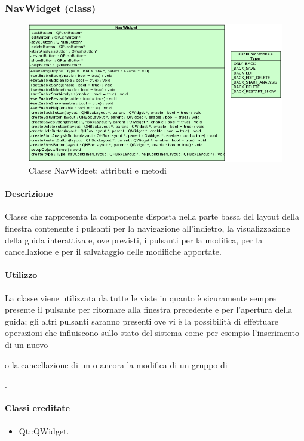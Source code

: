 \subsubsection{NavWidget (class)}
\label{spenav}
\begin{figure}[!h]
\centering
			\includegraphics[width=1.1\linewidth]{./Content/Immagini/view/NavWidget.png}
			\caption{Classe NavWidget: attributi e metodi}
			\label{cl_nav}
\end{figure}
\paragraph{Descrizione \\}
Classe che rappresenta la componente disposta nella parte bassa del layout della finestra contenente i pulsanti per la navigazione all'indietro, la visualizzazione della guida interattiva e, ove previsti, i pulsanti per la modifica, per la cancellazione e per il salvataggio delle modifiche apportate.
\paragraph{Utilizzo\\}
La classe viene utilizzata da tutte le viste in quanto è sicuramente sempre presente il pulsante per ritornare alla finestra precedente e per l'apertura della guida; gli altri pulsanti saranno presenti ove vi è la possibilità di effettuare operazioni che influiscono sullo stato del sistema come per esempio l'inserimento di un nuovo \subject{} o la cancellazione di un \protocol{} o ancora la modifica di un gruppo di \subject{}.
\paragraph{Classi ereditate\\}
\begin{itemize}
\item Qt::QWidget.
\end{itemize}
